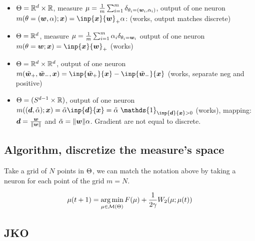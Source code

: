 \begin{itemize}
	\item $\Theta = \mathbb{R}^d \times \mathbb{R}$, measure $\mu = \frac{1}{m} \sum_{i=1}^{m} \delta_{\theta_i = ({\bm{w}}_i, \alpha_i)}$, output of one neuron $m(\param=(\vw,\alpha); \vx) = \inp{\vx}{\vw}_+ \alpha$: (works, output matches discrete)
	\item $\Theta = \mathbb{R}^d$, measure $\mu = \frac{1}{m} \sum_{i=1}^{m} \alpha_i \delta_{\theta_i = {\bm{w}}_i}$ output of one neuron $m(\param=\vw; \vx) = \inp{\vx}{\vw}_+$ (works)
	\item $\Theta = \mathbb{R}^d \times \mathbb{R}^d$, output of one neuron $m(\tilde{\vw}_+, \tilde{\vw}_-, \vx) = \inp{\tilde{\vw}_+}{\vx} - \inp{\tilde{\vw}_-}{\vx}$ (works, separate neg and positive)
	\item $\Theta = (S^{d-1} \times \mathbb{R})$, output of one neuron $m((\vd, \tilde{\alpha}); \vx) = \tilde{\alpha} \inp{\vd}{\vx} = \tilde{\alpha}\  \mathds{1}_{\inp{\vd}{\vx}>0} $ (works), mapping: ${\bm{d}} = \frac{{\bm{w}}}{\lVert{\bm{w}}\rVert}$ and $\tilde{\alpha}=\lVert{\bm{w}}\rVert \alpha$. Gradient are not equal to discrete.
\end{itemize}

\subsection{Algorithm, discretize the measure's space}

Take a grid of $N$ points in $\Theta$, we can match the notation above by taking a neuron for each point of the grid $m=N$.

\begin{equation}
	\mu(t+1) = \operatorname*{arg\,min}_{\mu \in \mathcal{M}(\Theta)} F(\mu) + \frac{1}{2 \gamma} W_2(\mu; \mu(t))
\end{equation}




\subsection{JKO}

